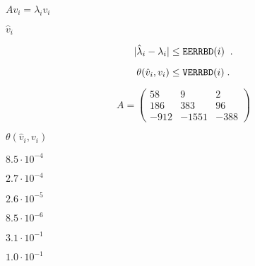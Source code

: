 {\newpage\clearpage
{}%
$A v_i = \lambda_i v_i$%
\lthtmlinlinemathZ
\lthtmlcheckvsize\clearpage}

{\newpage\clearpage
{}%
$\hat{v}_i$%
\lthtmlinlinemathZ
\lthtmlcheckvsize\clearpage}

{\newpage\clearpage
{}%
\begin{displaymath}
| \hat{\lambda}_i - \lambda_i | \leq {\tt EERRBD}(i) \; \; .
\end{displaymath}%
\lthtmldisplayZ
\lthtmlcheckvsize\clearpage}

{\newpage\clearpage
{}%
\begin{displaymath}
\theta ( \hat{v}_i , v_i ) \leq {\tt VERRBD}(i) \; .
\end{displaymath}%
\lthtmldisplayZ
\lthtmlcheckvsize\clearpage}

{\newpage\clearpage
{}%
\begin{displaymath}
A = \left( \begin{array}{ccc} 58 & 9 & 2 \\186 & 383 & 96 \\-912 & -1551 & -388 \end{array} \right) 
\end{displaymath}%
\lthtmldisplayZ
\lthtmlcheckvsize\clearpage}

{\newpage\clearpage
{}%
$\theta ( \hat{v}_i , v_i )$%
\lthtmlinlinemathZ
\lthtmlcheckvsize\clearpage}

{\newpage\clearpage
{}%
$8.5 \cdot 10^{-4}$%
\lthtmlinlinemathZ
\lthtmlcheckvsize\clearpage}

{\newpage\clearpage
{}%
$2.7 \cdot 10^{-4}$%
\lthtmlinlinemathZ
\lthtmlcheckvsize\clearpage}

{\newpage\clearpage
{}%
$2.6 \cdot 10^{-5}$%
\lthtmlinlinemathZ
\lthtmlcheckvsize\clearpage}

{\newpage\clearpage
{}%
$8.5 \cdot 10^{-6}$%
\lthtmlinlinemathZ
\lthtmlcheckvsize\clearpage}

{\newpage\clearpage
{}%
$3.1 \cdot 10^{-1}$%
\lthtmlinlinemathZ
\lthtmlcheckvsize\clearpage}

{\newpage\clearpage
{}%
$1.0 \cdot 10^{-1}$%
\lthtmlinlinemathZ
\lthtmlcheckvsize\clearpage}

